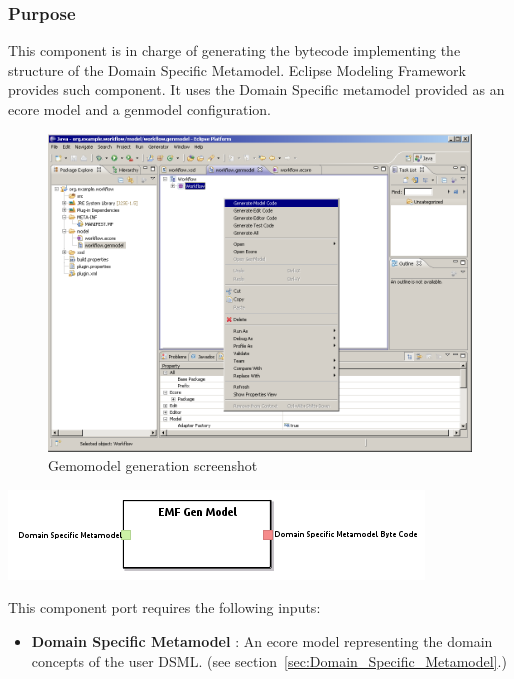 \documentclass{gemoc} %
\begin{document}
\subsubsection{Purpose}
This component is in charge of generating the bytecode implementing the structure of the Domain Specific Metamodel. Eclipse Modeling Framework provides such component. It uses the Domain Specific metamodel provided as an ecore model and a genmodel configuration.
\begin{figure}[h]
	\begin{center}
	\includegraphics*[trim=0.0cm 0.0cm 0cm 0.0cm, clip=true, width=1.0\linewidth]{../images/EMFGenModel.png}
	\caption{Gemomodel generation screenshot}
	\end{center}
\end{figure}

\begin{center}
\includegraphics*[trim=0.0cm 0.0cm 0cm 0.0cm, clip=true]{../images/generated/Generated_EMF_Gen_Model.png}
\end{center}

This component port requires the following inputs:
\begin{itemize}
  \item \textbf{Domain Specific Metamodel} :
An ecore model representing the domain concepts of the user DSML.
(see section~\ref{sec:Domain_Specific_Metamodel}.)
\end{itemize}
\end{document}
